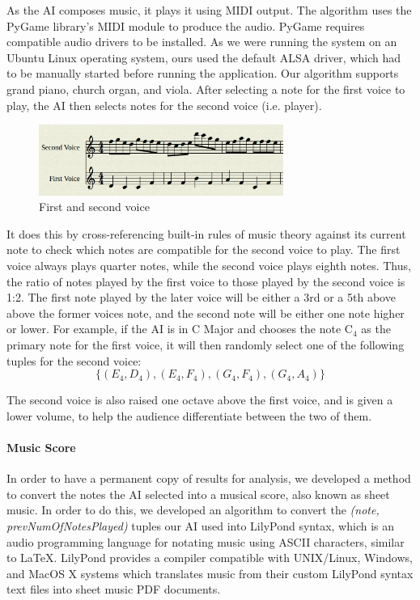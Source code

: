 \documentclass{chi2009}
\begin{document}
As the AI composes music, it plays it using MIDI output. The algorithm uses the PyGame library's MIDI module to produce the audio.  PyGame requires compatible audio drivers to be installed.  As we were running the system on an Ubuntu Linux operating system, ours used the default ALSA driver, which had to be manually started before running the application.  Our algorithm supports grand piano, church organ, and viola.  After selecting a note for the first voice to play, the AI then selects notes for the second voice (i.e. player).

\begin{figure}[htp]
\centering
\includegraphics[width=8cm]{two_voices}
\caption{First and second voice}
\label{fig:two_voices}
\end{figure}


It does this by cross-referencing built-in rules of music theory against its current note to check which notes are compatible for the second voice to play.  The first voice always plays quarter notes, while the second voice plays eighth notes.  Thus, the ratio of notes played by the first voice to those played by the second voice is 1:2. The first note played by the later voice will be either a 3rd or a 5th above above the former voices note, and the second note will be either one note higher or lower.  For example, if the AI is in C Major and chooses the note C$_4$ as the primary note for the first voice, it will then randomly select one of the following tuples for the second voice:
$$\{(E_4, D_4), (E_4, F_4), (G_4, F_4), (G_4, A_4)\}$$



The second voice is also raised one octave above the first voice, and is given a lower volume, to help the audience differentiate between the two of them.



\paragraph{Music Score}

In order to have a permanent copy of results for analysis, we developed a method to convert 
the notes the AI selected into a musical score, also known as sheet music. In order to do this, we developed an algorithm to convert the \textit{(note, prevNumOfNotesPlayed)} tuples our AI used into LilyPond syntax, which is an audio programming language for notating music using ASCII characters, similar to LaTeX. 
LilyPond provides a compiler compatible with UNIX/Linux, Windows, and MacOS X systems which translates music from their custom LilyPond syntax text files into sheet music PDF documents.
\end{document}
